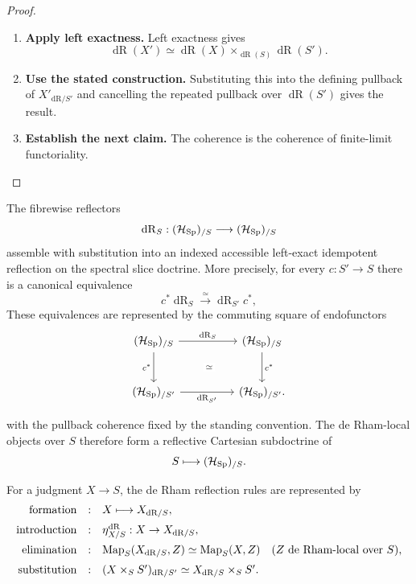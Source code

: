\begin{proof}
\leavevmode
\begin{enumerate}[label=\textup{(\arabic*)}]
    \item \textbf{Apply left exactness.}
    Left exactness gives
    \[
    \operatorname{dR}(X')
    \simeq
    \operatorname{dR}(X)
    \times_{\operatorname{dR}(S)}
    \operatorname{dR}(S').
    \]
    \item \textbf{Use the stated construction.}
    Substituting this into the defining pullback of
    \(X'_{\mathrm{dR}/S'}\) and cancelling the repeated pullback over
    \(\operatorname{dR}(S')\) gives the result.
    \item \textbf{Establish the next claim.}
    The coherence is the coherence of
    finite-limit functoriality.
\end{enumerate}
\end{proof}

\begin{theorem}
\label{thm:indexed-spectral-de-Rham-reflection}
The fibrewise reflectors
\[
  \operatorname{dR}_S:
  (\mathcal H_{\operatorname{Sp}})_{/S}
  \longrightarrow
  (\mathcal H_{\operatorname{Sp}})_{/S}
\]
assemble with substitution into an indexed accessible left-exact idempotent
reflection on the spectral slice doctrine. More precisely, for every
\(c:S'\to S\) there is a canonical equivalence
\[
  c^*\operatorname{dR}_S
  \xrightarrow{\simeq}
  \operatorname{dR}_{S'}c^*,
\]
These equivalences are represented by the commuting square of endofunctors
\[
\begin{tikzcd}[column sep=huge,row sep=large]
  (\mathcal H_{\Sp})_{/S}
    \arrow[r,"\operatorname{dR}_S"]
    \arrow[d,"c^*"']
  &
  (\mathcal H_{\Sp})_{/S}
    \arrow[d,"c^*"]
  \\
  (\mathcal H_{\Sp})_{/S'}
    \arrow[r,"\operatorname{dR}_{S'}"']
  &
  (\mathcal H_{\Sp})_{/S'}
    \arrow[ul,phantom,"\scriptstyle\simeq" description].
\end{tikzcd}
\]

with the pullback coherence fixed by the standing convention. The de Rham-local
objects over \(S\) therefore form a
reflective Cartesian subdoctrine of
\[
  S\longmapsto(\mathcal H_{\operatorname{Sp}})_{/S}.
\]

For a judgment \(X\to S\), the de Rham reflection rules are represented by
\[
\begin{array}{rcl}
\textup{formation} &:& X\longmapsto X_{\mathrm{dR}/S},\\[2mm]
\textup{introduction} &:& \eta_{X/S}^{\mathrm{dR}}:X\to X_{\mathrm{dR}/S},\\[2mm]
\textup{elimination} &:&
\operatorname{Map}_S(X_{\mathrm{dR}/S},Z)\simeq\operatorname{Map}_S(X,Z)
\quad(Z\text{ de Rham-local over }S),\\[2mm]
\textup{substitution} &:&
(X\times_SS')_{\mathrm{dR}/S'}
\simeq
X_{\mathrm{dR}/S}\times_SS'.
\end{array}
\]
\end{theorem}

